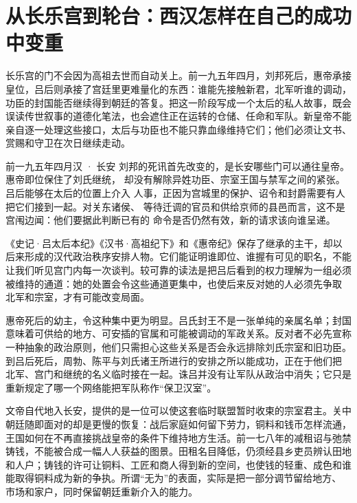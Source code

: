 \section{从长乐宫到轮台：西汉怎样在自己的成功中变重}
\label{sec:han-late-western-depth}

长乐宫的门不会因为高祖去世而自动关上。前一九五年四月，刘邦死后，惠帝承接
皇位，吕后则承接了宫廷里更难量化的东西：谁能先接触新君，北军听谁的调动，
功臣的封国能否继续得到朝廷的答复。把这一阶段写成一个太后的私人故事，既会
误读传世叙事的道德化笔法，也会遮住正在运转的仓储、任命和军队。新皇帝不能
亲自逐一处理这些接口，太后与功臣也不能只靠血缘维持它们；他们必须让文书、
赏赐和守卫在次日继续走动。

\begin{event}{}{前一九五年四月}{汉 · 长安}{}
刘邦的死讯首先改变的，是长安哪些门可以通往皇帝。惠帝即位保住了刘氏继统，
却没有解除异姓功臣、宗室王国与禁军之间的紧张。吕后能够在太后的位置上介入
人事，正因为宫城里的保护、诏令和封爵需要有人把它们接到一起。对关东诸侯、
等待迁调的官员和供给京师的县邑而言，这不是宫闱边闻：他们要据此判断已有的
命令是否仍然有效，新的请求该向谁呈递。

《史记·吕太后本纪》《汉书·高祖纪下》和《惠帝纪》保存了继承的主干，却以
后来形成的汉代政治秩序安排人物。它们能证明谁即位、谁握有可见的职名，不能
让我们听见宫门内每一次谈判。较可靠的读法是把吕后看到的权力理解为一组必须
被维持的通道：她的处置会令这些通道更集中，也使后来反对她的人必须先争取
北军和宗室，才有可能改变局面。
\end{event}

惠帝死后的幼主，令这种集中更为明显。吕氏封王不是一张单纯的亲属名单；封国
意味着可供给的地方、可安插的官属和可能被调动的军政关系。反对者不必先宣称
一种抽象的政治原则，他们只需担心这些关系是否会永远排除刘氏宗室和旧功臣。
到吕后死后，周勃、陈平与刘氏诸王所进行的安排之所以能成功，正在于他们把
北军、宫门和继统的名义临时接在一起。诛吕并没有让军队从政治中消失；它只是
重新规定了哪一个网络能把军队称作“保卫汉室”。

文帝自代地入长安，提供的是一位可以使这套临时联盟暂时收束的宗室君主。关中
朝廷随即面对的却是更慢的恢复：战后家庭如何留下劳力，铜料和钱币怎样流通，
王国如何在不再直接挑战皇帝的条件下维持地方生活。前一七八年的减租诏与弛禁
铸钱，不能被合成一幅人人获益的图景。田租名目降低，仍须经县乡吏员辨认田地
和人户；铸钱的许可让铜料、工匠和商人得到新的空间，也使钱的轻重、成色和谁
能取得铜料成为新的争执。所谓“无为”的表面，实际是把一部分调节留给地方、
市场和家户，同时保留朝廷重新介入的能力。


